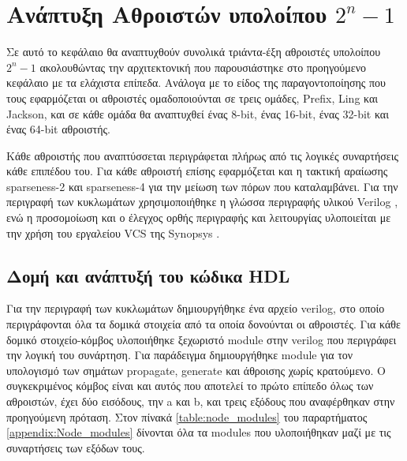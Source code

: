 \section{Ανάπτυξη Αθροιστών υπολοίπου $2^n-1$ }

Σε αυτό το κεφάλαιο θα αναπτυχθούν συνολικά τριάντα-έξη αθροιστές υπολοίπου $2^n-1$
ακολουθώντας την αρχιτεκτονική που παρουσιάστηκε στο προηγούμενο κεφάλαιο 
με τα ελάχιστα επίπεδα. Ανάλογα με το είδος της παραγοντοποίησης που τους εφαρμόζεται 
οι αθροιστές ομαδοποιούνται σε τρεις ομάδες, Prefix, Ling και Jackson,
και σε κάθε ομάδα θα αναπτυχθεί ένας 8-bit, ένας 16-bit, ένας 32-bit και ένας 64-bit 
αθροιστής. 

Κάθε αθροιστής που αναπτύσσεται περιγράφεται πλήρως από τις λογικές 
συναρτήσεις κάθε επιπέδου του. Για κάθε αθροιστή επίσης εφαρμόζεται και η τακτική αραίωσης
sparseness-2 και sparseness-4 για την μείωση των πόρων που καταλαμβάνει. Για την περιγραφή των 
κυκλωμάτων χρησιμοποιήθηκε η γλώσσα περιγραφής υλικού Verilog \cite{1620780}, ενώ η προσομοίωση 
και ο έλεγχος ορθής περιγραφής και λειτουργίας υλοποιείται με την χρήση του εργαλείου VCS της 
Synopsys \cite{vcs-synopsys}. 






\subsection{Δομή και ανάπτυξή του κώδικα HDL}

Για την περιγραφή των κυκλωμάτων δημιουργήθηκε ένα αρχείο verilog, στο οποίο περιγράφονται
όλα τα δομικά στοιχεία από τα οποία δονούνται οι αθροιστές. Για κάθε δομικό στοιχείο-κόμβος
υλοποιήθηκε ξεχωριστό module στην verilog που περιγράφει την λογική του συνάρτηση. Για 
παράδειγμα δημιουργήθηκε module για τον υπολογισμό των σημάτων propagate, generate και άθροισης
χωρίς κρατούμενο. Ο συγκεκριμένος κόμβος είναι και αυτός που αποτελεί το πρώτο επίπεδο
όλως των αθροιστών, έχει δύο εισόδους, την a και b, και τρεις εξόδους που αναφέρθηκαν 
στην προηγούμενη πρόταση. Στον πίνακά \ref{table:node_modules} του παραρτήματος 
\ref{appendix:Node_modules} δίνονται όλα τα modules που υλοποιήθηκαν μαζί με τις συναρτήσεις 
των εξόδων τους.





